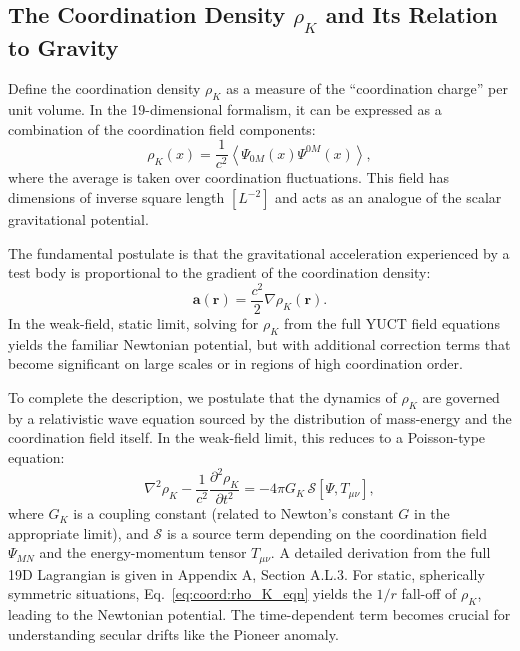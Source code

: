 \documentclass[12pt,a4paper]{article}
\theoremstyle{remark}
\begin{document}
	\subsection{The Coordination Density \(\rho_K\) and Its Relation to Gravity}
	\label{subsec:rho_K_definition}
	
	Define the coordination density \(\rho_K\) as a measure of the ``coordination charge'' per unit volume. In the 19-dimensional formalism, it can be expressed as a combination of the coordination field components:
	\begin{equation}
		\rho_K(x) = \frac{1}{c^2} \left\langle \Psi_{0M}(x) \Psi^{0M}(x) \right\rangle,
		\label{eq:coord:rho_K_def}
	\end{equation}
	where the average is taken over coordination fluctuations. This field has dimensions of inverse square length \([L^{-2}]\) and acts as an analogue of the scalar gravitational potential.
	
	The fundamental postulate is that the gravitational acceleration experienced by a test body is proportional to the gradient of the coordination density:
	\begin{equation}
		\mathbf{a}(\mathbf{r}) = \frac{c^2}{2} \nabla \rho_K(\mathbf{r}).
		\label{eq:coord:grav_from_rho}
	\end{equation}
	In the weak-field, static limit, solving for \(\rho_K\) from the full YUCT field equations yields the familiar Newtonian potential, but with additional correction terms that become significant on large scales or in regions of high coordination order.
	
	To complete the description, we postulate that the dynamics of \(\rho_K\) are governed by a relativistic wave equation sourced by the distribution of mass-energy and the coordination field itself. In the weak-field limit, this reduces to a Poisson-type equation:
	\begin{equation}
		\nabla^2 \rho_K - \frac{1}{c^2}\frac{\partial^2 \rho_K}{\partial t^2} = -4\pi G_K \, \mathcal{S}[\Psi, T_{\mu\nu}],
		\label{eq:coord:rho_K_eqn}
	\end{equation}
	where \(G_K\) is a coupling constant (related to Newton's constant \(G\) in the appropriate limit), and \(\mathcal{S}\) is a source term depending on the coordination field \(\Psi_{MN}\) and the energy-momentum tensor \(T_{\mu\nu}\). A detailed derivation from the full 19D Lagrangian is given in Appendix A, Section A.L.3. For static, spherically symmetric situations, Eq.~\eqref{eq:coord:rho_K_eqn} yields the \(1/r\) fall-off of \(\rho_K\), leading to the Newtonian potential. The time-dependent term becomes crucial for understanding secular drifts like the Pioneer anomaly.
	
\end{document}
